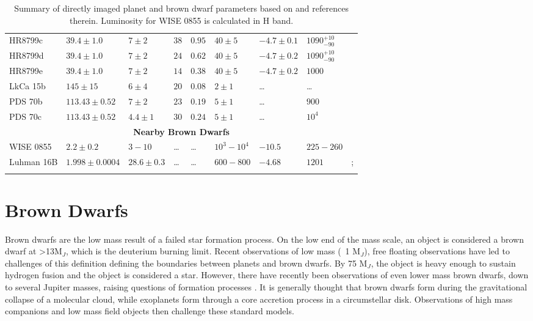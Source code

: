 \begin{landscape}
\begin{table}[t]
\begin{small}
\begin{tabular}{lllllllll}
				HR8799c   & $39.4\pm1.0$  & $7\pm2$     & $38$ & $0.95$ & $40\pm5$ & $-4.7\pm0.1$ & $1090^{+10}_{-90}$ &\parencite{Marois2008,Skemer2012}\\
				HR8799d   & $39.4\pm1.0$  & $7\pm2$     & $24$ & $0.62$ & $40\pm5$ & $-4.7\pm0.2$ & $1090^{+10}_{-90}$ &\parencite{Marois2008,Skemer2012}\\
				HR8799e   & $39.4\pm1.0$  & $7\pm2$     & $14$ & $0.38$ & $40\pm5$ & $-4.7\pm0.2$ & $1000$ &\parencite{Marois2008,Skemer2012}\\	
				LkCa 15b  & $145\pm15$    & $6\pm4$     & $20$ & $0.08$ & $2\pm1$ & \ldots & \ldots &\\
				PDS 70b   & $113.43\pm0.52$ & $7\pm2$   & $23$ & $0.19$ & $5\pm1$ & \ldots & $900$ &\parencite{Haffert2019}\\
				PDS 70c   & $113.43\pm0.52$ & $4.4\pm1$ & $30$ & $0.24$ & $5\pm1$ & \ldots &  $10^{4}$ & \parencite{Haffert2019}\\
				\midrule
				\multicolumn{9}{c}{\textbf{Nearby Brown Dwarfs}}\\
				\midrule
				WISE 0855   & $2.2\pm0.2$ & $3-10$ & \ldots & \ldots & $10^{3}-10^{4}$ & $-10.5$ &  $225-260$ & \parencite{Luhman2014,Tinney2014}\\
				Luhman 16B   & $1.998\pm0.0004$ & $28.6\pm0.3$ & \ldots & \ldots & $600-800$ & $-4.68$&  $1201$ & \parencite{Sahlmann2015};\\
																								&&&&&&&&\parencite{Garcia2017}\\
				\bottomrule
			\end{tabular}
		\end{small}
		\caption{Summary of directly imaged planet and brown dwarf parameters based on \parencite{Bowler2016} and references therein. Luminosity for WISE 0855 is calculated in H band.}
		\label{tab:exoplanetparams}
	\end{table}
\end{landscape}
\section{Brown Dwarfs}
Brown dwarfs are the low mass result of a failed star formation process.
On the low end of the mass scale, an object is considered a brown dwarf at >13M$_{J}$, which is the deuterium burning limit. 
Recent observations of low mass (~1 M$_{J}$), free floating observations have led to challenges of this definition defining the boundaries between planets and brown dwarfs.
By 75 M$_{J}$, the object is heavy enough to sustain hydrogen fusion and the object is considered a star.
However, there have recently been observations of even lower mass brown dwarfs, down to several Jupiter masses, raising questions of formation processes \parencite{Luhman2014}.
It is generally thought that brown dwarfs form during the gravitational collapse of a molecular cloud, while exoplanets form through a core accretion process in a circumstellar disk.
Observations of high mass companions and low mass field objects then challenge these standard models.

